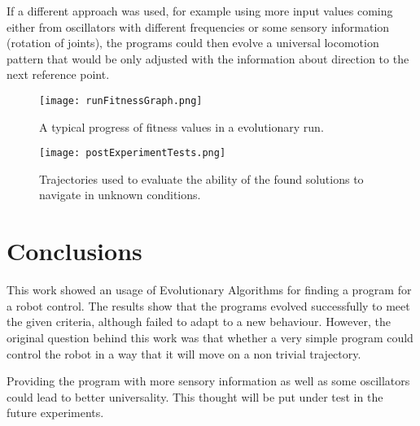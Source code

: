 \documentclass{ExcelAtFIT}
\begin{document}
If a different approach was used, for example using more input values coming either from oscillators with different frequencies or some sensory information (rotation of joints), the programs could then evolve a universal locomotion pattern that would be only adjusted with the information about direction to the next reference point.

\begin{figure}[t]
	\centering
	{\texttt{[image: runFitnessGraph.png]}}
	\caption{
	A typical progress of fitness values in a evolutionary run.
	}
	\label{fig:FitnessGraph}
\end{figure}

\begin{figure}[t]
	\centering
	{\texttt{[image: postExperimentTests.png]}}
	\caption{
	Trajectories used to evaluate the ability of the found solutions to navigate in unknown conditions.
	}
	\label{fig:PostExperimentTests}
\end{figure}


\section{Conclusions}
\label{sec:Conclusions}

This work showed an usage of Evolutionary Algorithms for finding a program for a robot control.
The results show that the programs evolved successfully to meet the given criteria, although failed to adapt to a new behaviour.
However, the original question behind this work was that whether a very simple program could control the robot in a way that it will move on a non trivial trajectory.

Providing the program with more sensory information as well as some oscillators could lead to better universality.
This thought will be put under test in the future experiments.
\end{document}
